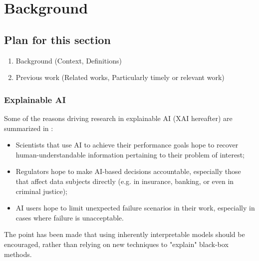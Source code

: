 \documentclass[../main.tex]{subfiles}
\begin{document}
\chapter{Background} %
\label{Chapter1} %


\newcommand{\keyword}[1]{\textbf{#1}}
\newcommand{\tabhead}[1]{\textbf{#1}}
\newcommand{\code}[1]{\texttt{#1}}
\newcommand{\file}[1]{\texttt{\bfseries#1}}
\newcommand{\option}[1]{\texttt{\itshape#1}}


\section{Plan for this section}
\begin{enumerate}
    \item Background (Context, Definitions)
    \item Previous work (Related works, Particularly timely or relevant work)
\end{enumerate}

\subsection{Explainable AI}
Some of the reasons driving research in explainable AI (XAI hereafter) are summarized in \cite{zhangSurvey2021}:
\begin{itemize}
    \item Scientists that use AI to achieve their performance goals hope to recover human-understandable information pertaining to their problem of interest;
    \item Regulators hope to make AI-based decisions accountable, especially those that affect data subjects directly (e.g. in insurance, banking, or even in criminal justice);
    \item AI users hope to limit unexpected failure scenarios in their work, especially in cases where failure is unacceptable.
\end{itemize}

The point has been made \cite{rudinWhy2019} that using inherently interpretable models should be encouraged, rather than relying on new techniques to "explain" black-box methods.
\end{document}
